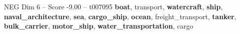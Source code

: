 \begin{textsample}{NEG Dim 6 – Score -9.00 – t007095}  \label{ex:f6_neg_018}
\textbf{boat}, transport, \textbf{watercraft}, \textbf{ship}, \textbf{naval\_architecture}, \textbf{sea}, \textbf{cargo\_ship}, \textbf{ocean}, freight\_transport, \textbf{tanker}, \textbf{bulk\_carrier}, \textbf{motor\_ship}, \textbf{water\_transportation}, cargo

\end{textsample}
